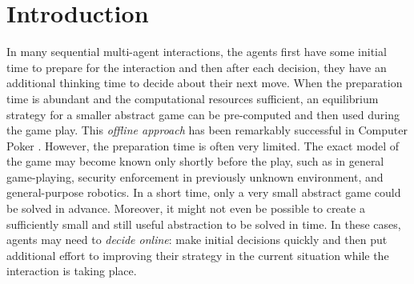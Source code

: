 \documentclass[letterpaper]{article}
\begin{document}
\section{Introduction}


In many sequential multi-agent interactions, the agents first have some initial time to prepare for the interaction and then after each decision, they have an additional thinking time to decide about their next move. When the preparation time is abundant and the computational resources sufficient, an equilibrium strategy for a smaller abstract game can be pre-computed and then used during the game play. This {\it offline approach} has been remarkably successful in Computer Poker \cite{}.
However, the preparation time is often very limited. The exact model of the game may become known only shortly before the play, such as in general game-playing, security enforcement in previously unknown environment, and general-purpose robotics. In a short time, only a very small abstract game could be solved in advance. Moreover, it might not even be possible to create a sufficiently small and still useful abstraction to be solved in time. In these cases, agents may need to {\it decide online}: make initial decisions quickly and then put additional effort to improving their strategy in the current situation while the interaction is taking place.
\end{document}

